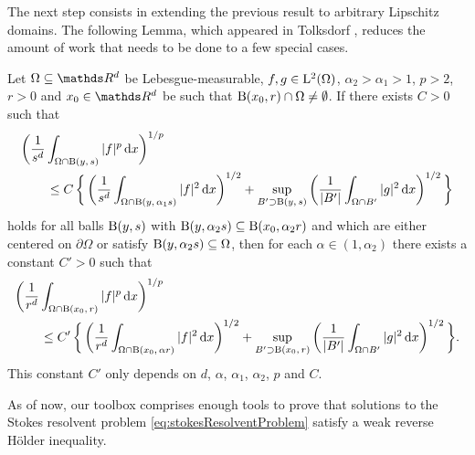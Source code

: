 The next step consists in extending the previous result to arbitrary Lipschitz domains. 
The following Lemma, which appeared in Tolksdorf \cite[Lem.\@~4.2]{tolksdorf2017}, reduces the amount of work that needs to be done to a few special cases.

\begin{lem}
  \label{lem:ballsforballs}
  Let $\Omega \subseteq \R^d$ be Lebesgue-measurable, $f, g \in \mathrm{L}^2(\Omega)$, $\alpha_2 > \alpha_1 > 1$, $p > 2$, $r > 0$ and $x_0 \in \R^d$ be such that $\mathrm{B}(x_0,r) \cap \Omega \neq \emptyset$.
  If there exists $C > 0$ such that
  \begin{align*}
    &\bigg( \frac{1}{s^d} \int_{\Omega \cap \mathrm{B}(y,\, s)} |f|^p \, {\operatorname{d}\!{x}} \bigg)^{1/p} \\
    &\qquad\leq C\, \bigg\{\, \bigg( \frac{1}{s^d} \int_{\Omega \cap \mathrm{B}(y,\, \alpha_1 s)} |f|^2 \, {\operatorname{d}\!{x}} \bigg)^{1/2} 
    + \sup_{B' \supset \mathrm{B}(y,\,s)} \bigg( \frac{1}{|B'|} \int_{\Omega \cap B'} |g|^2 \, {\operatorname{d}\!{x}} \bigg)^{1/2} \, \bigg\}
  \end{align*}
  holds for all balls $\mathrm{B}(y,s)$ with $\mathrm{B}(y,\alpha_2 s) \subseteq \mathrm{B}(x_0, \alpha_2 r)$ and which are either centered on $\partial\Omega$ or satisfy $\mathrm{B}(y,\alpha_2 s) \subseteq \Omega$, then for each $\alpha \in (1,\alpha_2)$ there exists a constant $C' > 0$ such that
  \begin{align*}
    &\bigg( \frac{1}{r^d} \int_{\Omega \cap \mathrm{B}(x_0,\, r)} |f|^p \, {\operatorname{d}\!{x}} \bigg)^{1/p} 
    \\
    &\qquad\leq C'\, \bigg\{\, \bigg( \frac{1}{r^d} \int_{\Omega \cap \mathrm{B}(x_0,\,\alpha  r)} |f|^2 \, {\operatorname{d}\!{x}} \bigg)^{1/2} + \sup_{B' \supset \mathrm{B}(x_0,\,r)} \bigg( \frac{1}{|B'|} \int_{\Omega \cap B'} |g|^2 \, {\operatorname{d}\!{x}} \bigg)^{1/2} \,\bigg\}.
  \end{align*}
  This constant $C'$ only depends on $d$, $\alpha$, $\alpha_1$, $\alpha_2$, $p$ and $C$.
\end{lem}


As of now, our toolbox comprises enough tools to prove that solutions to the Stokes resolvent problem \eqref{eq:stokesResolventProblem} satisfy a weak reverse H\"older inequality.


